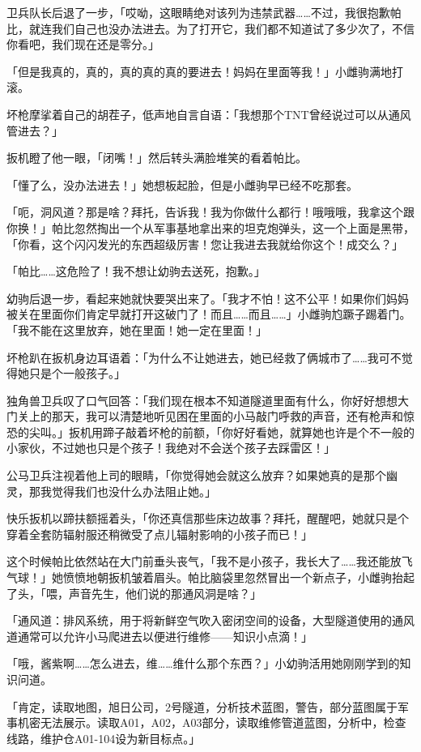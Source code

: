 卫兵队长后退了一步，「哎呦，这眼睛绝对该列为违禁武器……不过，我很抱歉帕比，就连我们自己也没办法进去。为了打开它，我们都不知道试了多少次了，不信你看吧，我们现在还是零分。」

「但是我真的，真的，真的真的真的要进去！妈妈在里面等我！」小雌驹满地打滚。

坏枪摩挲着自己的胡茬子，低声地自言自语：「我想那个TNT曾经说过可以从通风管进去？」

扳机瞪了他一眼，「闭嘴！」然后转头满脸堆笑的看着帕比。

「懂了么，没办法进去！」她想板起脸，但是小雌驹早已经不吃那套。

「呃，洞风道？那是啥？拜托，告诉我！我为你做什么都行！哦哦哦，我拿这个跟你换！」帕比忽然掏出一个从军事基地拿出来的坦克炮弹头，这一个上面是黑带，「你看，这个闪闪发光的东西超级厉害！您让我进去我就给你这个！成交么？」

「帕比……这危险了！我不想让幼驹去送死，抱歉。」

幼驹后退一步，看起来她就快要哭出来了。「我才不怕！这不公平！如果你们妈妈被关在里面你们肯定早就打开这破门了！而且……而且……」小雌驹尥蹶子踢着门。「我不能在这里放弃，她在里面！她一定在里面！」

坏枪趴在扳机身边耳语着：「为什么不让她进去，她已经救了俩城市了……我可不觉得她只是个一般孩子。」

独角兽卫兵叹了口气回答：「我们现在根本不知道隧道里面有什么，你好好想想大门关上的那天，我可以清楚地听见困在里面的小马敲门呼救的声音，还有枪声和惊恐的尖叫。」扳机用蹄子敲着坏枪的前额，「你好好看她，就算她也许是个不一般的小家伙，不过她也只是个孩子！我绝对不会送个孩子去踩雷区！」

公马卫兵注视着他上司的眼睛，「你觉得她会就这么放弃？如果她真的是那个幽灵，那我觉得我们也没什么办法阻止她。」

快乐扳机以蹄扶额摇着头，「你还真信那些床边故事？拜托，醒醒吧，她就只是个穿着全套防辐射服还稍微受了点儿辐射影响的小孩子而已！」

这个时候帕比依然站在大门前垂头丧气，「我不是小孩子，我长大了……我还能放飞气球！」她愤愤地朝扳机皱着眉头。帕比脑袋里忽然冒出一个新点子，小雌驹抬起了头，「喂，声音先生，他们说的那通风洞是啥？」

「{\mtzh 通风道：排风系统，用于将新鲜空气吹入密闭空间的设备，大型隧道使用的通风道通常可以允许小马爬进去以便进行维修——知识小点滴！}」

「哦，酱紫啊……怎么进去，维……维什么那个东西？」小幼驹活用她刚刚学到的知识问道。

「{\mtzh 肯定，读取地图，旭日公司，2号隧道，分析技术蓝图，警告，部分蓝图属于军事机密无法展示。读取A01，A02，A03部分，读取维修管道蓝图，分析中，检查线路，维护仓A01-104设为新目标点。}」

